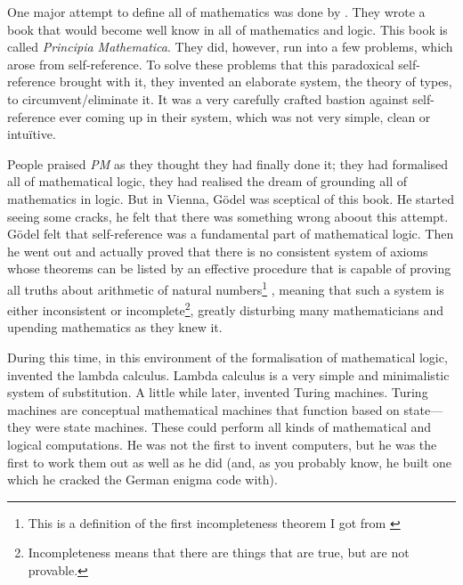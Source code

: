 \documentclass[11pt]{book}
\begin{document}
One major attempt to define all of mathematics was done by
\textcite{russell1997}. They wrote a book that would become well know in all of
mathematics and logic. This book is called \emph{Principia Mathematica}. They
did, however, run into a few problems, which arose from self-reference. To
solve these problems that this paradoxical self-reference brought with it, they
invented an elaborate system, the theory of types, to circumvent/eliminate it.
It was a very carefully crafted bastion against self-reference ever coming up
in their system, which was not very simple, clean or intuïtive.

People praised \emph{PM} as they thought they had finally done it; they had
formalised all of mathematical logic, they had realised the dream of grounding
all of mathematics in logic. But in Vienna, Gödel was sceptical of this book.
He started seeing some cracks, he felt that there was something wrong aboout
this attempt. Gödel felt that self-reference was a fundamental part of
mathematical logic. Then he went out and actually proved that there is no
consistent system of axioms whose theorems can be listed by an effective
procedure that is capable of proving all truths about arithmetic of natural
numbers\footnote{This is a definition of the first incompleteness theorem I got
from \textcite{wiki:Incompleteness_theorems}} \parencite{godel1931}, meaning
that such a system is either inconsistent or incomplete\footnote{Incompleteness
means that there are things that are true, but are not provable.}, greatly
disturbing many mathematicians and upending mathematics as they knew it.

During this time, in this environment of the formalisation of mathematical
logic, \textcite{church1932} invented the lambda calculus. Lambda calculus is a
very simple and minimalistic system of substitution. A little while later,
\textcite{turing1936, turing1937correction} invented Turing machines. Turing
machines are conceptual mathematical machines that function based on
state---they were state machines. These could perform all kinds of mathematical
and logical computations. He was not the first to invent computers, but he was
the first to work them out as well as he did (and, as you probably know, he
built one which he cracked the German enigma code with).
\end{document}
